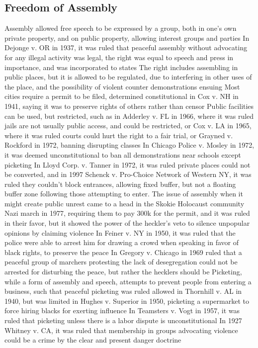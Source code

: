 \documentclass[11 pt, twoside]{article}
\newenvironment{outline*}
{
	\begin{outline}[enumerate]
	}
	{\end{outline}
}
\begin{document}
\subsection{Freedom of Assembly}
\begin{outline*}
\1 Assembly allowed free speech to be expressed by a group, both in one's own private property, and on public property, allowing interest groups and parties
\2 In Dejonge v. OR in 1937, it was ruled that peaceful assembly without advocating for any illegal activity was legal, the right was equal to speech and press in importance, and was incorporated to states
\1 The right includes assembling in public places, but it is allowed to be regulated, due to interfering in other uses of the place, and the possibility of violent counter demonstrations ensuing
\2 Most cities require a permit to be filed, determined constitutional in Cox v. NH in 1941, saying it was to preserve rights of others rather than censor
\1 Public facilities can be used, but restricted, such as in Adderley v. FL in 1966, where it was ruled jails are not usually public access, and could be restricted, or Cox v. LA in 1965, where it was ruled courts could hurt the right to a fair trial, or Grayned v. Rockford in 1972, banning disrupting classes
\2 In Chicago Police v. Mosley in 1972, it was deemed unconstitutional to ban all demonstrations near schools except picketing
\2 In Lloyd Corp. v. Tanner in 1972, it was ruled private places could not be converted, and in 1997 Schenck v. Pro-Choice Network of Western NY, it was ruled they couldn’t block entrances, allowing fixed buffer, but not a floating buffer zone following those attempting to enter.
\1 The issue of assembly when it might create public unrest came to a head in the Skokie Holocaust community Nazi march in 1977, requiring them to pay 300k for the permit, and it was ruled in their favor, but it showed the power of the heckler’s veto to silence unpopular opinions by claiming violence
\2 In Feiner v. NY in 1950, it was ruled that the police were able to arrest him for drawing a crowd when speaking in favor of black rights, to preserve the peace
\2 In Gregory v. Chicago in 1969 ruled that a peaceful group of marchers protesting the lack of desegregation could not be arrested for disturbing the peace, but rather the hecklers should be
\1 Picketing, while a form of assembly and speech, attempts to prevent people from entering a business, such that peaceful picketing was ruled allowed in Thornhill v. AL in 1940, but was limited in Hughes v. Superior in 1950, picketing a supermarket to force hiring blacks for exerting influence
\2 In Teamsters v. Vogt in 1957, it was ruled that picketing unless there is a labor dispute is unconstitutional
\1 In 1927 Whitney v. CA, it was ruled that membership in groups advocating violence could be a crime by the clear and present danger doctrine
\end{outline*}
\end{document}
